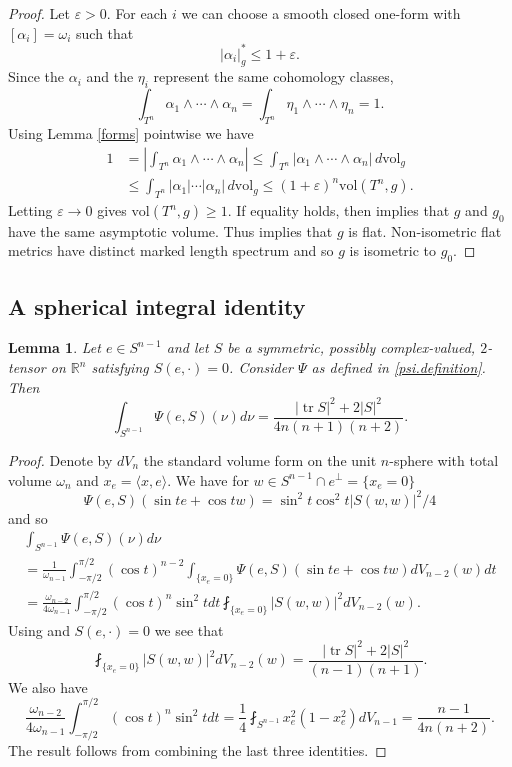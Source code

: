 \documentclass[11pt]{amsart}
\def\R{\mathbb R}
\def\tr{\operatorname{tr}}
\def\vol{\mathrm{vol}}
\newtheorem{lemm}[thm]{Lemma}
\theoremstyle{remark}
\theoremstyle{definition}
\begin{document}
{\begin{proof}
			Let $\varepsilon>0$. For each $i$ we can choose a smooth closed one-form with
			$[\alpha_i]=\omega_i$ such that
			$$|\alpha_i|^*_g\leq 1+\varepsilon.$$
			Since the $\alpha_i$ and the $\eta_i$ represent the same cohomology classes,
			$$\int_{T^n}\alpha_1\wedge\cdots\wedge\alpha_n
			=\int_{T^n}\eta_1\wedge\cdots\wedge\eta_n=1.$$
			Using Lemma \ref{forms} pointwise we have
			\begin{align*}
				1&=\left|\int_{T^n}\alpha_1\wedge\cdots\wedge\alpha_n\right|
				\leq \int_{T^n}|\alpha_1\wedge\cdots\wedge\alpha_n|\,d\vol_g\\
				&\leq \int_{T^n}|\alpha_1|\cdots |\alpha_n|\,d\vol_g\leq (1+\varepsilon)^n\vol(T^n,g).
			\end{align*}
			Letting $\varepsilon\to 0$ gives $\vol(T^n,g)\geq 1$.
			If equality holds, then \cite[Proposition~8.5.18]{burago-ivanov-book} implies that $g$ and $g_0$ have the same asymptotic volume. Thus \cite[Theorem~1(b)]{burago-ivanov-gafapaper} implies that $g$ is flat.  Non-isometric flat metrics have distinct marked length spectrum and so $g$ is isometric to $g_0$.
	\end{proof}}
	
	
	
	
	\subsection{A spherical integral identity}
	{
		
		\begin{lemm}\label{psi.average.identity}
			Let $e\in S^{n-1}$ and let $S$ be a symmetric, possibly complex-valued, $2$-tensor on $\R^n$ satisfying $S(e,\cdot)=0$. Consider $\Psi$ as defined in \eqref{psi.definition}.
			Then
			$$
			\int_{S^{n-1}}\Psi(e,S)(\nu)d\nu=\frac{|\tr S|^2+2|S|^2}{4n(n+1)(n+2)}.
			$$
		\end{lemm}
		
		\begin{proof}
			Denote by $dV_n$ the standard volume form on the unit $n$-sphere with total volume $\omega_n$ and $x_e=\langle x,e\rangle$. We have for $w\in S^{n-1}\cap e^{\bot}=\{x_e=0\}$ $$\Psi(e,S)(\sin te+\cos t w)=\sin^2 t\cos^2t|S(w,w)|^2/4$$ and so
			\begin{multline*}
				\int_{S^{n-1}}\Psi(e,S)(\nu)d\nu\\
				=\frac{1}{\omega_{n-1}}\int_{-\pi/2}^{\pi/2}(\cos t)^{n-2}\int_{\{x_e=0\}}\Psi(e,S)(\sin te+\cos t w)dV_{n-2}(w)dt\\
				=\frac{\omega_{n-2}}{4\omega_{n-1}}\int_{-\pi/2}^{\pi/2}(\cos t)^{n}\sin^2tdt\fint_{\{x_e=0\}}|S(w,w)|^2dV_{n-2}(w).
			\end{multline*}
			Using  \cite[Theorem~2.4]{bodmann-ehler-graf} and $S(e,\cdot)=0$ we see that
			$$\fint_{\{x_e=0\}}|S(w,w)|^2dV_{n-2}(w)=\frac{|\tr S|^2+2|S|^2}{(n-1)(n+1)}.$$
			We also have
			$$\frac{\omega_{n-2}}{4\omega_{n-1}}\int_{-\pi/2}^{\pi/2}(\cos t)^{n}\sin^2tdt=\frac14\fint_{S^{n-1}}x_e^2(1-x_e^2)dV_{n-1}=
			\frac{n-1}{4n(n+2)}.$$
			The result follows from combining the last three identities.
	\end{proof}}
	
\end{document}
